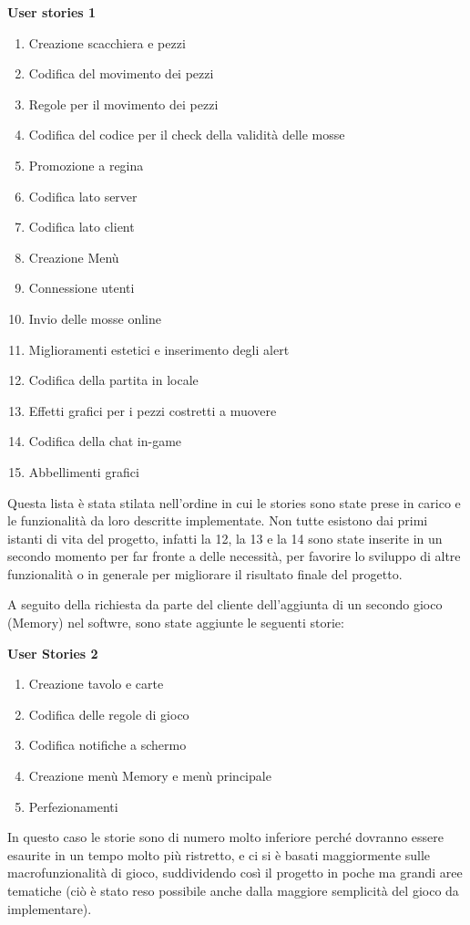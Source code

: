 \documentclass[12pt]{article}
\begin{document}
\textbf{\Large User stories 1}
\begin{enumerate}
\item Creazione scacchiera e pezzi
\item Codifica del movimento dei pezzi
\item Regole per il movimento dei pezzi
\item Codifica del codice per il check della validità delle mosse
\item Promozione a regina
\item Codifica lato server
\item Codifica lato client
\item Creazione Menù
\item Connessione utenti
\item Invio delle mosse online
\item Miglioramenti estetici e inserimento degli alert
\item Codifica della partita in locale
\item Effetti grafici per i pezzi costretti a muovere
\item Codifica della chat in-game
\item Abbellimenti grafici
\end{enumerate}

Questa lista è stata stilata nell'ordine in cui le stories sono state prese in carico e le funzionalità da loro descritte implementate. Non tutte esistono dai primi istanti di vita del progetto, infatti la 12, la 13 e la 14 sono state inserite in un secondo momento per far fronte a delle necessità, per favorire  lo sviluppo di altre funzionalità o in generale per migliorare il risultato finale del progetto.

A seguito della richiesta da parte del cliente dell'aggiunta di un secondo gioco (Memory) nel softwre, sono state aggiunte le seguenti storie:
\newline

\textbf{\Large User Stories 2}
\begin{enumerate}
\item Creazione tavolo e carte
\item Codifica delle regole di gioco
\item Codifica notifiche a schermo
\item Creazione menù Memory e menù principale
\item Perfezionamenti
\end{enumerate}

In questo caso le storie sono di numero molto inferiore perché dovranno essere esaurite in un tempo molto più ristretto, e ci si è basati maggiormente sulle macrofunzionalità di gioco, suddividendo così il progetto in poche ma grandi aree tematiche (ciò è stato reso possibile anche dalla maggiore semplicità del gioco da implementare).
\end{document}
